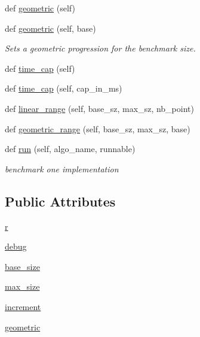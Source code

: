 \begin{DoxyCompactItemize}
def \hyperlink{classbridges_1_1sorting__benchmark_1_1_sorting_benchmark_a0ccdd8c0ab411934335c41814325e2c1}{geometric} (self)
\item 
def \hyperlink{classbridges_1_1sorting__benchmark_1_1_sorting_benchmark_a003c4fe5333585f2130609ea24e3eb72}{geometric} (self, base)
\begin{DoxyCompactList}\small\item\em Sets a geometric progression for the benchmark size. \end{DoxyCompactList}\item 
def \hyperlink{classbridges_1_1sorting__benchmark_1_1_sorting_benchmark_a125d5bf68c5eb0fa1b319e37582fdc42}{time\+\_\+cap} (self)
\item 
def \hyperlink{classbridges_1_1sorting__benchmark_1_1_sorting_benchmark_af0705baca355e23e9e92f8d85a5fd33f}{time\+\_\+cap} (self, cap\+\_\+in\+\_\+ms)
\item 
def \hyperlink{classbridges_1_1sorting__benchmark_1_1_sorting_benchmark_ab5bfca8680018f4c043a78b25dbc1948}{linear\+\_\+range} (self, base\+\_\+sz, max\+\_\+sz, nb\+\_\+point)
\item 
def \hyperlink{classbridges_1_1sorting__benchmark_1_1_sorting_benchmark_ac9bc45a12b3ebab79d05785c01e4a99e}{geometric\+\_\+range} (self, base\+\_\+sz, max\+\_\+sz, base)
\item 
def \hyperlink{classbridges_1_1sorting__benchmark_1_1_sorting_benchmark_a419601bff1043add1068cc957c924f49}{run} (self, algo\+\_\+name, runnable)
\begin{DoxyCompactList}\small\item\em benchmark one implementation \end{DoxyCompactList}\end{DoxyCompactItemize}
\subsection*{Public Attributes}
\begin{DoxyCompactItemize}
\item 
\hyperlink{classbridges_1_1sorting__benchmark_1_1_sorting_benchmark_ae7fb15c11ff3cd6f17a2966f70d26a92}{r}
\item 
\hyperlink{classbridges_1_1sorting__benchmark_1_1_sorting_benchmark_abe5f172441e50097fecbd69fb724fd62}{debug}
\item 
\hyperlink{classbridges_1_1sorting__benchmark_1_1_sorting_benchmark_a5cf6780eab930f6dc96a517839c14bf7}{base\+\_\+size}
\item 
\hyperlink{classbridges_1_1sorting__benchmark_1_1_sorting_benchmark_af1aa3db22656da5aad6992547146e1c7}{max\+\_\+size}
\item 
\hyperlink{classbridges_1_1sorting__benchmark_1_1_sorting_benchmark_aa3b593efe1eac874fcb18a326b1b51d1}{increment}
\item 
\hyperlink{classbridges_1_1sorting__benchmark_1_1_sorting_benchmark_a3f5b4fe45cba8268f53716f6eb322a66}{geometric}
\end{DoxyCompactItemize}


